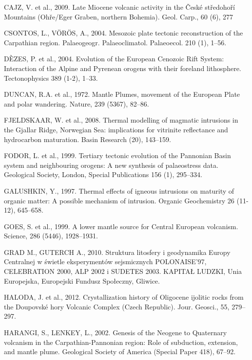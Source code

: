 \documentclass[11.5pt,twoside]{report}
\begin{document}
\begin{multicols}{3}
\uppercase{Cajz, V.} et al., 2009. Late Miocene volcanic activity in the České středohoří Mountains (Ohře/Eger Graben, northern Bohemia). Geol. Carp., 60 (6), 277

\uppercase{Csontos, L., Vörös, A., 2004.} Mesozoic plate tectonic reconstruction of the Carpathian region. Palaeogeogr. Palaeoclimatol. Palaeoecol. 210 (1), 1–56. 

\uppercase{D\`{E}zes, P.} et al., 2004. Evolution of the European Cenozoic Rift System: Interaction of the Alpine and Pyrenean orogens with their foreland lithosphere. Tectonophysics 389 (1-2), 1–33.

\uppercase{Duncan, R.A.} et al., 1972. Mantle Plumes, movement of the European Plate and polar wandering. Nature, 239 (5367), 82–86.

\uppercase{Fjeldskaar, W.} et al., 2008. Thermal modelling of magmatic intrusions in the Gjallar Ridge, Norwegian Sea: implications for vitrinite reflectance and hydrocarbon maturation. Basin Research (20), 143–159. 

\uppercase{Fodor, L.} et al., 1999. Tertiary tectonic evolution of the Pannonian Basin system and neighbouring orogens: A new synthesis of palaeostress data. Geological Society, London, Special Publications 156 (1), 295–334. 

\uppercase{Galushkin, Y., 1997.} Thermal effects of igneous intrusions on maturity of organic matter: A possible mechanism of intrusion. Organic Geochemistry 26 (11-12), 645–658. 

\uppercase{Goes, S.} et al., 1999. A lower mantle source for Central European volcanism. Science, 286 (5446), 1928–1931.

\uppercase{Grad M., Guterch A., 2010.} Struktura litosfery i geodynamika Europy Centralnej w świetle eksperymentów sejsmicznych POLONAISE’97, CELEBRATION 2000, ALP 2002 i SUDETES 2003. KAPITAŁ LUDZKI, Unia Europejska, Europejski Fundusz Społeczny, Gliwice.



\uppercase{Haloda, J.} et al., 2012. Crystallization history of Oligocene ijolitic rocks from the Doupovské hory Volcanic Complex (Czech Republic). Jour. Geosci., 55, 279–297.

\uppercase{Harangi, S., Lenkey, L., 2002.} Genesis of the Neogene to Quaternary volcanism in the Carpathian-Pannonian region: Role of subduction, extension, and mantle plume. Geological Society of America (Special Paper 418), 67–92.


\end{multicols}
\end{document}
